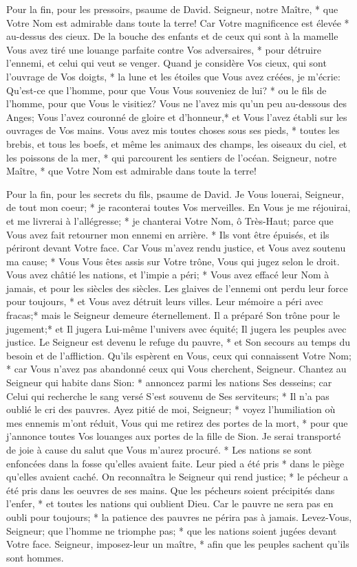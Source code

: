 Pour la fin, pour les pressoirs, psaume de David.
Seigneur, notre Maître, * que Votre Nom est admirable dans toute la terre! Car Votre magnificence est élevée * au-dessus des cieux.
De la bouche des enfants et de ceux qui sont à la mamelle Vous avez tiré une louange parfaite contre Vos adversaires, * pour détruire l'ennemi, et celui qui veut se venger.
Quand je considère Vos cieux, qui sont l'ouvrage de Vos doigts, * la lune et les étoiles que Vous avez créées,
je m'écrie: Qu'est-ce que l'homme, pour que Vous Vous souveniez de lui? * ou le fils de l'homme, pour que Vous le visitiez?
Vous ne l'avez mis qu'un peu au-dessous des Anges; Vous l'avez couronné de gloire et d'honneur,*
et Vous l'avez établi sur les ouvrages de Vos mains.
Vous avez mis toutes choses sous ses pieds, * toutes les brebis, et tous les boefs, et même les animaux des champs,
les oiseaux du ciel, et les poissons de la mer, * qui parcourent les sentiers de l'océan.
Seigneur, notre Maître, * que Votre Nom est admirable dans toute la terre!

Pour la fin, pour les secrets du fils, psaume de David.
Je Vous louerai, Seigneur, de tout mon coeur; * je raconterai toutes Vos merveilles.
En Vous je me réjouirai, et me livrerai à l'allégresse; * je chanterai Votre Nom, ô Très-Haut;
parce que Vous avez fait retourner mon ennemi en arrière. * Ils vont être épuisés, et ils périront devant Votre face.
Car Vous m'avez rendu justice, et Vous avez soutenu ma cause; * Vous Vous êtes assis sur Votre trône, Vous qui jugez selon le droit.
Vous avez châtié les nations, et l'impie a péri; * Vous avez effacé leur Nom à jamais, et pour les siècles des siècles.
Les glaives de l'ennemi ont perdu leur force pour toujours, * et Vous avez détruit leurs villes. Leur mémoire a péri avec fracas;*
mais le Seigneur demeure éternellement. Il a préparé Son trône pour le jugement;*
et Il jugera Lui-même l'univers avec équité; Il jugera les peuples avec justice.
Le Seigneur est devenu le refuge du pauvre, * et Son secours au temps du besoin et de l'affliction.
Qu'ils espèrent en Vous, ceux qui connaissent Votre Nom; * car Vous n'avez pas abandonné ceux qui Vous cherchent, Seigneur.
Chantez au Seigneur qui habite dans Sion: * annoncez parmi les nations Ses desseins;
car Celui qui recherche le sang versé S'est souvenu de Ses serviteurs; * Il n'a pas oublié le cri des pauvres.
Ayez pitié de moi, Seigneur; * voyez l'humiliation où mes ennemis m'ont réduit,
Vous qui me retirez des portes de la mort, * pour que j'annonce toutes Vos louanges aux portes de la fille de Sion.
Je serai transporté de joie à cause du salut que Vous m'aurez procuré. * Les nations se sont enfoncées dans la fosse qu'elles avaient faite. Leur pied a été pris * dans le piège qu'elles avaient caché.
On reconnaîtra le Seigneur qui rend justice; * le pécheur a été pris dans les oeuvres de ses mains.
Que les pécheurs soient précipités dans l'enfer, * et toutes les nations qui oublient Dieu.
Car le pauvre ne sera pas en oubli pour toujours; * la patience des pauvres ne périra pas à jamais.
Levez-Vous, Seigneur; que l'homme ne triomphe pas; * que les nations soient jugées devant Votre face.
Seigneur, imposez-leur un maître, * afin que les peuples sachent qu'ils sont hommes.

